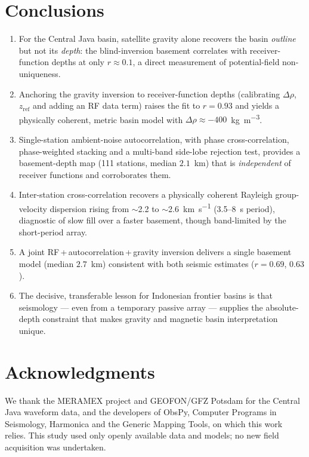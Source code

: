 \section{Conclusions}
\begin{enumerate}
\item For the Central Java basin, satellite gravity alone recovers the basin
\emph{outline} but not its \emph{depth}: the blind-inversion basement correlates
with receiver-function depths at only $r\approx0.1$, a direct measurement of
potential-field non-uniqueness.
\item Anchoring the gravity inversion to receiver-function depths (calibrating
$\Delta\rho$, $z_{\mathrm{ref}}$ and adding an RF data term) raises the fit to
$r=0.93$ and yields a physically coherent, metric basin model with
$\Delta\rho\approx-400$~\si{\kg\per\m\cubed}.
\item Single-station ambient-noise autocorrelation, with phase cross-correlation,
phase-weighted stacking and a multi-band side-lobe rejection test, provides a
basement-depth map (111 stations, median $2.1$~km) that is \emph{independent} of
receiver functions and corroborates them.
\item Inter-station cross-correlation recovers a physically coherent Rayleigh
group-velocity dispersion rising from $\sim$2.2 to $\sim$2.6~\si{\km\per\s}
(3.5--8~s period), diagnostic of slow fill over a faster basement, though
band-limited by the short-period array.
\item A joint RF\,+\,autocorrelation\,+\,gravity inversion delivers a single
basement model (median $2.7$~km) consistent with both seismic estimates
($r=0.69$, $0.63$).
\item The decisive, transferable lesson for Indonesian frontier basins is that
seismology --- even from a temporary passive array --- supplies the absolute-depth
constraint that makes gravity and magnetic basin interpretation unique.
\end{enumerate}

\section*{Acknowledgments}
We thank the MERAMEX project and GEOFON/GFZ Potsdam for the Central Java waveform
data, and the developers of ObsPy, Computer Programs in Seismology, Harmonica and
the Generic Mapping Tools, on which this work relies. This study used only openly
available data and models; no new field acquisition was undertaken.


